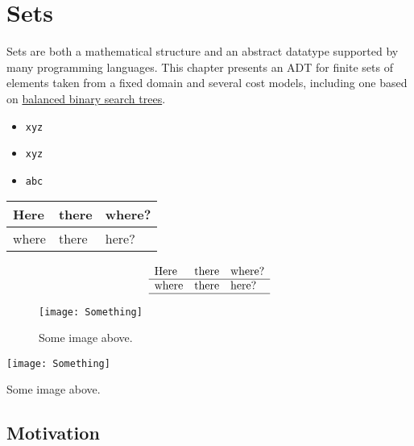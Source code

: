 \chapter{Sets}
\label{ch:sets}

\begin{preamble}[baslik][cover = image]
  Sets are both a mathematical structure and an abstract datatype
  supported by many programming languages.  This chapter presents an ADT for
  finite sets of elements taken from a fixed domain and several cost models, including one based on \href{ch:bst::adt}{balanced binary search trees}.
\begin{itemize}
\item
\lstinline'xyz'
\item
\lstinline`xyz`
\item
\lstinline!abc! 
\end{itemize}
\end{preamble}

\begin{table}[Table title][cover = coverimage.pdf, sound=playthis.mp3]
\begin{tabular}{lll}
Here & there & where? 
\\ \hline
where & there & here? 
\\ \hline
\end{tabular}
\end{table}


\begin{table}
\[
\begin{array}{lll}
\mbox{Here} & \mbox{there} & \mbox{where?} 
\\ \hline
\mbox{where} & \mbox{there} & \mbox{here?} 
\\ \hline
\end{array}
\]
\end{table}

\begin{figure}
\texttt{[image: Something]}
\caption{Some image above.}
\end{figure}


\begin{table}
\texttt{[image: Something]}
\caption{Some image above.}
\end{table}

\section{Motivation}
\label{sec:sets::math}


